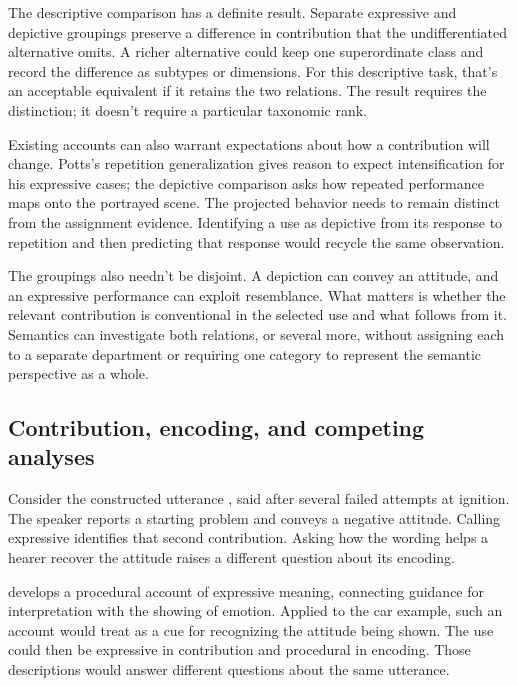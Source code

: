 \documentclass[12pt]{article}
\begin{document}
The descriptive comparison has a definite result. Separate expressive
and depictive groupings preserve a difference in contribution that the
undifferentiated alternative omits. A richer alternative could keep one
superordinate class and record the difference as subtypes or dimensions.
For this descriptive task, that's an acceptable equivalent if it retains
the two relations. The result requires the distinction; it doesn't require
a particular taxonomic rank.

Existing accounts can also warrant expectations about how a contribution
will change. Potts's repetition generalization gives reason to expect
intensification for his expressive cases; the depictive comparison asks
how repeated performance maps onto the portrayed scene. The projected
behavior needs to remain distinct from the assignment evidence. Identifying
a use as depictive from its response to repetition and then predicting
that response would recycle the same observation.

The groupings also needn't be disjoint. A depiction can convey an attitude,
and an expressive performance can exploit resemblance. What matters is
whether the relevant contribution is conventional in the selected use and
what follows from it. Semantics can investigate both relations, or several
more, without assigning each to a separate department or requiring one
category to represent the semantic perspective as a whole.

\subsection{Contribution, encoding, and competing analyses}\label{sec:encoding}

Consider the constructed utterance ,
said after several failed attempts at ignition. The speaker reports a
starting problem and conveys a negative attitude. Calling 
expressive identifies that second contribution. Asking how the wording
helps a hearer recover the attitude raises a different question about
its encoding.

\textcite{wharton2016expressives} develops a procedural account of expressive
meaning, connecting guidance for interpretation with the showing of emotion.
Applied to the car example, such an account would treat 
as a cue for recognizing the attitude being shown. The use could then
be expressive in contribution and procedural in encoding. Those descriptions
would answer different questions about the same utterance.
\end{document}
